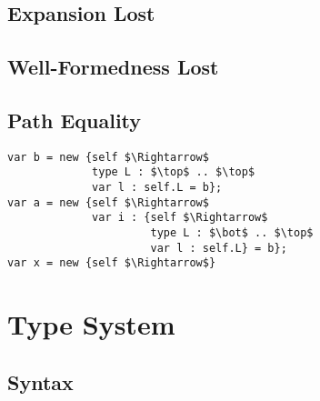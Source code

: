 \documentclass{llncs}
\begin{document}
\subsection{Expansion Lost}
\subsection{Well-Formedness Lost}

\subsection{Path Equality}

\begin{lstlisting}[mathescape, style=custom_lang]
var b = new {self $\Rightarrow$
             type L : $\top$ .. $\top$
             var l : self.L = b};
var a = new {self $\Rightarrow$
             var i : {self $\Rightarrow$
                      type L : $\bot$ .. $\top$
                      var l : self.L} = b};
var x = new {self $\Rightarrow$}

\end{lstlisting}



\section{Type System}
	\label{s:type_sys}


\subsection{Syntax}
\end{document}

